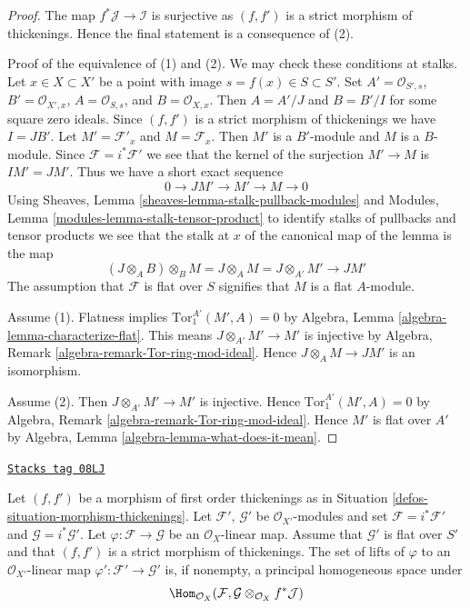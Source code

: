 \begin{proof}
The map $f^*\mathcal{J} \to \mathcal{I}$ is surjective
as $(f, f')$ is a strict morphism of thickenings.
Hence the final statement is a consequence of (2).

\medskip\noindent
Proof of the equivalence of (1) and (2). We may check these conditions
at stalks. Let $x \in X \subset X'$
be a point with image $s = f(x) \in S \subset S'$.
Set $A' = \mathcal{O}_{S', s}$, $B' = \mathcal{O}_{X', x}$,
$A = \mathcal{O}_{S, s}$, and $B = \mathcal{O}_{X, x}$.
Then $A = A'/J$ and $B = B'/I$ for some square zero ideals.
Since $(f, f')$ is a strict morphism of thickenings we have $I = JB'$.
Let $M' = \mathcal{F}'_x$ and $M = \mathcal{F}_x$.
Then $M'$ is a $B'$-module and $M$ is a $B$-module.
Since $\mathcal{F} = i^*\mathcal{F}'$ we see that the kernel of the
surjection $M' \to M$ is $IM' = JM'$. Thus we have a short exact
sequence
$$
0 \to JM' \to M' \to M \to 0
$$
Using
Sheaves, Lemma \ref{sheaves-lemma-stalk-pullback-modules}
and
Modules, Lemma \ref{modules-lemma-stalk-tensor-product}
to identify stalks of pullbacks and tensor products we see
that the stalk at $x$ of the canonical map of the lemma is the map
$$
(J \otimes_A B) \otimes_B M = J \otimes_A M = J \otimes_{A'} M'
\longrightarrow JM'
$$
The assumption that $\mathcal{F}$ is flat over $S$ signifies that
$M$ is a flat $A$-module.

\medskip\noindent
Assume (1). Flatness implies $\text{Tor}_1^{A'}(M', A) = 0$ by
Algebra, Lemma \ref{algebra-lemma-characterize-flat}.
This means $J \otimes_{A'} M' \to M'$ is injective by
Algebra, Remark \ref{algebra-remark-Tor-ring-mod-ideal}.
Hence $J \otimes_A M \to JM'$ is an isomorphism.

\medskip\noindent
Assume (2). Then $J \otimes_{A'} M' \to M'$ is injective. Hence
$\text{Tor}_1^{A'}(M', A) = 0$ by
Algebra, Remark \ref{algebra-remark-Tor-ring-mod-ideal}.
Hence $M'$ is flat over $A'$ by
Algebra, Lemma \ref{algebra-lemma-what-does-it-mean}.
\end{proof}

\begin{lemma}
\label{defos-lemma-inf-map-rel}
\href{https://stacks.math.columbia.edu/tag/08LJ}{\texttt{Stacks tag 08LJ}}

Let $(f, f')$ be a morphism of first order thickenings as in
Situation \ref{defos-situation-morphism-thickenings}.
Let $\mathcal{F}'$, $\mathcal{G}'$ be $\mathcal{O}_{X'}$-modules and set
$\mathcal{F} = i^*\mathcal{F}'$ and $\mathcal{G} = i^*\mathcal{G}'$.
Let $\varphi : \mathcal{F} \to \mathcal{G}$ be an $\mathcal{O}_X$-linear map.
Assume that $\mathcal{G}'$ is flat over $S'$ and that
$(f, f')$ is a strict morphism of thickenings.
The set of lifts of $\varphi$ to an $\mathcal{O}_{X'}$-linear map
$\varphi' : \mathcal{F}' \to \mathcal{G}'$ is, if nonempty, a principal
homogeneous space under
$$
\Hom_{\mathcal{O}_X}(\mathcal{F},
\mathcal{G} \otimes_{\mathcal{O}_X} f^*\mathcal{J})
$$
\end{lemma}

